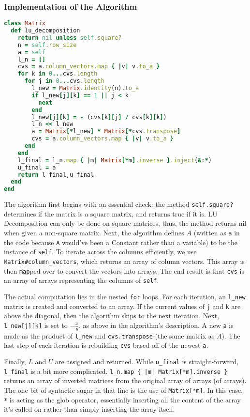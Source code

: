 \documentclass[letterpaper,12pt]{article}
\begin{document}
\subsubsection{Implementation of the Algorithm}

\lstset{caption=LU Decomposition}
\begin{lstlisting}[language=ruby]
class Matrix
  def lu_decomposition
    return nil unless self.square?
    n = self.row_size
    a = self
    l_n = []
    cvs = a.column_vectors.map { |v| v.to_a }
    for k in 0...cvs.length
      for j in 0...cvs.length
        l_new = Matrix.identity(n).to_a
        if l_new[j][k] == 1 || j < k
          next
        end
        l_new[j][k] = - (cvs[k][j] / cvs[k][k])
        l_n << l_new
        a = Matrix[*l_new] * Matrix[*cvs.transpose]
        cvs = a.column_vectors.map { |v| v.to_a }
      end
    end
    l_final = l_n.map { |m| Matrix[*m].inverse }.inject(&:*)
    u_final = a
    return l_final,u_final
  end
end
\end{lstlisting}

The algorithm first begins with an essential check: the method
\texttt{self.square?} determines if the matrix is a square matrix, and returns
true if it is.
LU Decomposition can only be done on square matrices, thus, the method returns
nil when given a non-square matrix.
Next, the algorithm defines $A$ (written as \texttt{a} in the code because
\texttt{A} would've been a Constant rather than a variable) to be the instance
of \texttt{self}.
To iterate across the columns efficiently, we use
\texttt{Matrix\#column\_vectors}, which returns an array of column vectors.
This array is then \texttt{map}ped over to convert the vectors into arrays.
The end result is that \texttt{cvs} is an array of arrays representing the
columns of \texttt{self}.

The actual computation lies in the nested \texttt{for} loops.
For each iteration, an \texttt{l\_new} matrix is created and converted to an
array.
If the current values of \texttt{j} and \texttt{k} are above the diagonal,
then the algorithm skips to the next iteration.
Next, \texttt{l\_new[j][k]} is set to $-\frac{x}{y}$, as above in the
algorithm's description.
A new \texttt{a} is made as the product of \texttt{l\_new} and
\texttt{cvs.transpose} (the same matrix as $A$).
The last step of each iteration is rebuilding \texttt{cvs} based off of the
newest \texttt{a}.

Finally, $L$ and $U$ are assigned and returned.
While \texttt{u\_final} is straight-forward, \texttt{l\_final} is a bit more
complicated.
\texttt{l\_n.map \{ |m| Matrix[*m].inverse \}} returns an array of inverted
matrices from the original array of arrays (of arrays).
The one bit of syntactic sugar in that line is the use of \texttt{Matrix[*m]}.
In this case, \texttt{*} is acting as the glob operator, essentially inserting
all the content of the array it's called on rather than simply inserting the
array itself.
\end{document}
